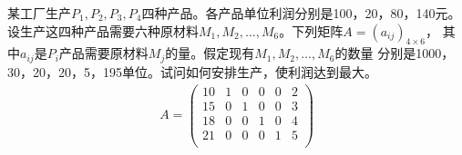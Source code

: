 某工厂生产$P_1,P_2,P_3,P_4$四种产品。各产品单位利润分别是100，20，80，140元。
设生产这四种产品需要六种原材料$M_1,M_2,\ldots,M_6$。下列矩阵$A=(a_{ij})_{4\times 6}$，
其中$a_{ij}$是$P_i$产品需要原材料$M_j$的量。假定现有$M_1,M_2,\ldots,M_6$的数量
分别是1000，30，20，20，5，195单位。试问如何安排生产，使利润达到最大。
\begin{align*}
    A = \left(
        \begin{matrix}
            10 & 1 & 0 & 0 & 0 & 2\\
            15 & 0 & 1 & 0 & 0 & 3\\
            18 & 0 & 0 & 1 & 0 & 4\\
            21 & 0 & 0 & 0 & 1 & 5\\
        \end{matrix}
    \right)
\end{align*}
